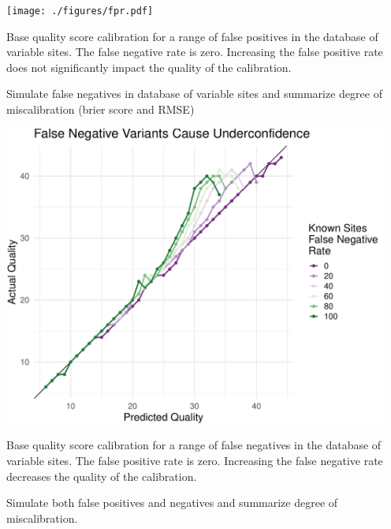 \documentclass{article}
\begin{document}
\begin{outline}
\begin{outline}
		\begin{outline}
			\item \texttt{[image: ./figures/fpr.pdf]}
			\item Base quality score calibration for a range of false positives in the database of variable sites. The false negative rate is zero. Increasing the false positive rate does not significantly impact the quality of the calibration.
		\end{outline}
		\item Simulate false negatives in database of variable sites and summarize degree of miscalibration (brier score and RMSE)
		\begin{outline}
			\item \includegraphics[width=5in]{./figures/fnr.pdf}
			\item Base quality score calibration for a range of false negatives in the database of variable sites. The false positive rate is zero. Increasing the false negative rate decreases the quality of the calibration.
		\end{outline}	
		\item Simulate both false positives and negatives and summarize degree of miscalibration.

\end{outline}
\end{outline}
\end{document}
